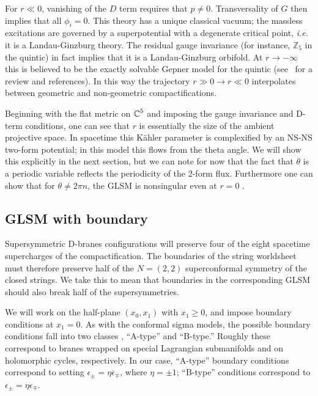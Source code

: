 \documentclass[a4paper,12pt]{article}
\def\Bbb{\mathbb}
\def\BZ{\mbox{$\Bbb Z$}} \def\BR{\mbox{$\Bbb R$}}
\def\BC{\mbox{$\Bbb C$}} \def\BP{\mbox{$\Bbb P$}}
\begin{document}
For $r \ll 0$, vanishing of the $D$ term requires that $p\neq 0$.
Transversality of $G$ then implies that all $\phi_i=0$.  This theory has a
unique classical vacuum; the massless excitations are governed by a
superpotential with a degenerate critical point, {\it i.e.} it is a
Landau-Ginzburg theory.  The residual gauge invariance (for instance,
$\BZ_5$ in 
the quintic) in fact implies that it is a Landau-Ginzburg orbifold. At $r
\rightarrow - \infty$ this is believed to be the exactly solvable Gepner
model for the quintic \cite{gepner} (see \cite{psarev}\ for a review and
references).  In this way the trajectory $r\gg 0 \rightarrow r\ll 0$
interpolates between geometric and non-geometric compactifications. 

Beginning with the flat metric on ${\bf \BC}^{5}$ and imposing the gauge
invariance and D-term conditions, one can see that $r$ is essentially the
size of the ambient projective space.  In spacetime this K\"ahler
parameter is complexified by an NS-NS two-form potential; in this model
this flows from the theta angle.  We will show this explicitly in the next
section, but we can note for now that the fact that $\theta$ is a periodic
variable reflects the periodicity of the 2-form flux.  Furthermore one can
show that for $\theta\neq 2\pi n$, the GLSM is nonsingular even at $r = 0$
\cite{wittenphases}. 

\subsection{GLSM with boundary}

Supersymmetric D-branes configurations will preserve four of the eight
spacetime supercharges of the compactification. The boundaries of the
string worldsheet must therefore preserve half of the $N=(2,2)$
superconformal symmetry of the closed strings.  We take this to mean that
boundaries in the corresponding GLSM should also break half of the
supersymmetries. 

We will work on the half-plane $(x_0,x_1)$ with $x_1 \geq 0$, and impose
boundary conditions at $x_1 = 0$. As with the conformal sigma models, the
possible boundary conditions fall into two classes \cite{ooy}, ``A-type''
and ``B-type.'' Roughly these correspond to branes wrapped on special
Lagrangian submanifolds and on holomorphic cycles, respectively. In our
case, ``A-type'' boundary conditions correspond to setting $\epsilon_\pm =
\eta \overline{\epsilon}_\mp$, where $\eta = \pm 1$; ``B-type'' conditions
correspond to $\epsilon_\pm = \eta \epsilon_\mp$. 
\end{document}
